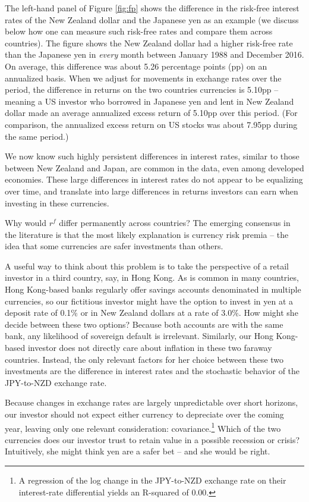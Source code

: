 \documentclass{ar-1col}
\begin{document}
The left-hand panel of Figure \ref{fig:fp} shows the difference in the risk-free interest rates of the New Zealand dollar and the Japanese yen as an example (we discuss below how one can measure such risk-free rates and compare them across countries). The figure shows the New Zealand dollar had a higher risk-free rate than the Japanese yen in \textit{every} month between January 1988 and December 2016. On average, this difference was about 5.26 percentage points (pp) on an annualized basis. When we adjust for movements in exchange rates over the period, the difference in returns on the two countries currencies is 5.10pp -- meaning a US investor who borrowed in Japanese yen and lent in New Zealand dollar made an average annualized excess return of 5.10pp over this period. (For comparison, the annualized excess return on US stocks was about 7.95pp during the same period.)

We now know such highly persistent differences in interest rates, similar to those between New Zealand and Japan, are common in the data, even among developed economies. These large differences in interest rates do not appear to be equalizing over time, and translate into large differences in returns investors can earn when investing in these currencies.

Why would $r^f$ differ permanently across countries? The emerging consensus in the literature is that the most likely explanation is currency risk premia -- the idea that some currencies are safer investments than others.

A useful way to think about this problem is to take the perspective of a retail investor in a third country, say, in Hong Kong. As is common in many countries, Hong Kong-based banks regularly offer savings accounts denominated in multiple currencies, so our fictitious investor might have the option to invest in yen at a deposit rate of 0.1\% or in New Zealand dollars at a rate of 3.0\%. How might she decide between these two options? Because both accounts are with the same bank, any likelihood of sovereign default is irrelevant. Similarly, our Hong Kong-based investor does not directly care about inflation in these two faraway countries. Instead, the only relevant factors for her choice between these two investments are the difference in interest rates and the stochastic behavior of the JPY-to-NZD exchange rate.

Because changes in exchange rates are largely unpredictable over short horizons, our investor should not expect either currency to depreciate over the coming year, leaving only one relevant consideration: covariance.\footnote{A regression of the log change in the JPY-to-NZD exchange rate on their interest-rate differential yields an R-squared of 0.00.} Which of the two currencies does our investor trust to retain value in a possible recession or crisis? Intuitively, she might think yen are a safer bet -- and she would be right.
\end{document}

